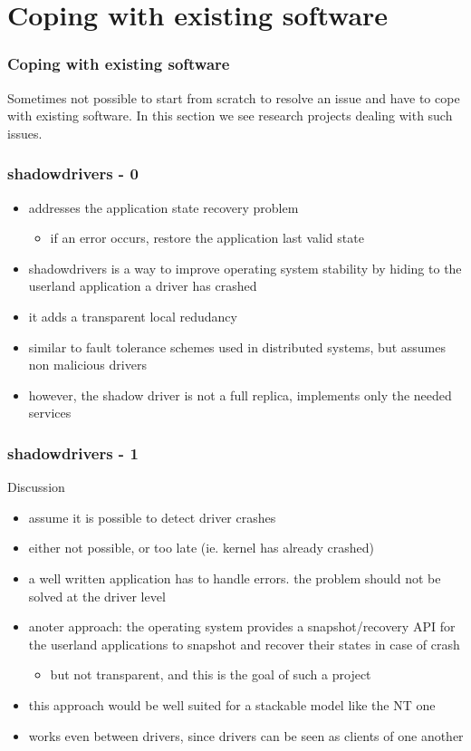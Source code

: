 
\section{Coping with existing software}

\begin{frame}
  \frametitle{Coping with existing software}
  Sometimes not possible to start from scratch to resolve an issue and have to cope with
  existing software. In this section we see research projects dealing with such issues.
\end{frame}


\begin{frame}
  \frametitle{shadowdrivers - 0}
  \begin{itemize}
    \item addresses the application state recovery problem
    \begin{itemize} \item if an error occurs, restore the application last valid state \end{itemize}
    \item shadowdrivers is a way to improve operating system stability by hiding to the userland application a driver has crashed
    \item it adds a transparent local redudancy
    \item similar to fault tolerance schemes used in distributed systems, but assumes non malicious drivers
    \item however, the shadow driver is not a full replica, implements only the needed services
  \end{itemize}
\end{frame}


\begin{frame}
  \frametitle{shadowdrivers - 1}
  Discussion
  \begin{itemize}
    \item assume it is possible to detect driver crashes
    \item either not possible, or too late (ie. kernel has already crashed)
    \item a well written application has to handle errors. the problem should not be solved at the driver level
    \item anoter approach: the operating system provides a snapshot/recovery API for the userland applications to snapshot and recover their states in case of crash
      \begin{itemize} \item but not transparent, and this is the goal of such a project \end{itemize}
    \item this approach would be well suited for a stackable model like the NT one
    \item works even between drivers, since drivers can be seen as clients of one another
  \end{itemize}
\end{frame}


